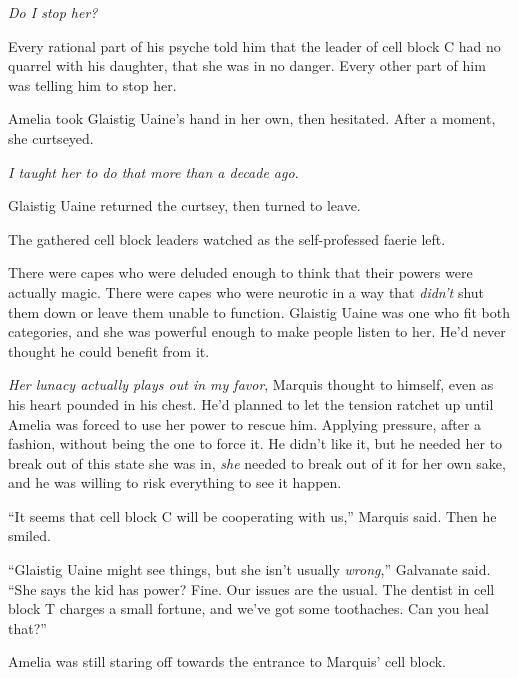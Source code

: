 \emph{Do I stop her?}



Every rational part of his psyche told him that the leader of cell block C had no quarrel with his daughter, that she was in no danger.  Every other part of him was telling him to stop her.



Amelia took Glaistig Uaine's hand in her own, then hesitated.  After a moment, she curtseyed.



\emph{I taught her to do that more than a decade ago}.



Glaistig Uaine returned the curtsey, then turned to leave.



The gathered cell block leaders watched as the self-professed faerie left.



There were capes who were deluded enough to think that their powers were actually magic.  There were capes who were neurotic in a way that \emph{didn't} shut them down or leave them unable to function.  Glaistig Uaine was one who fit both categories, and she was powerful enough to make people listen to her.  He'd never thought he could benefit from it.



\emph{Her lunacy actually plays out in my favor}, Marquis thought to himself, even as his heart pounded in his chest.  He'd planned to let the tension ratchet up until Amelia was forced to use her power to rescue him.  Applying pressure, after a fashion, without being the one to force it.  He didn't like it, but he needed her to break out of this state she was in, \emph{she }needed to break out of it for her own sake, and he was willing to risk everything to see it happen.



``It seems that cell block C will be cooperating with us,'' Marquis said.  Then he smiled.



``Glaistig Uaine might see things, but she isn't usually \emph{wrong},'' Galvanate said.  ``She says the kid has power?  Fine.  Our issues are the usual.  The dentist in cell block T charges a small fortune, and we've got some toothaches.  Can you heal that?''



Amelia was still staring off towards the entrance to Marquis' cell block.



